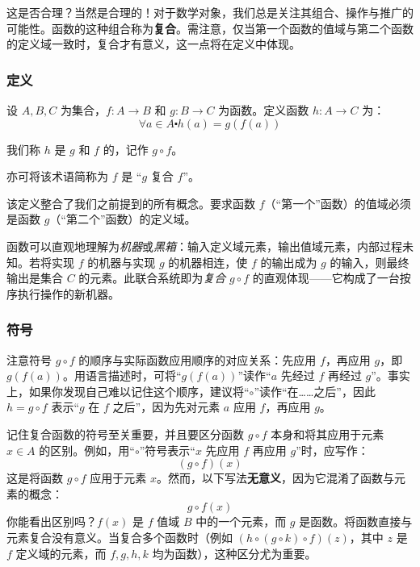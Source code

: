 这是否合理？当然是合理的！对于数学对象，我们总是关注其组合、操作与推广的可能性。函数的这种组合称为\textbf{复合}。需注意，仅当第一个函数的值域与第二个函数的定义域一致时，复合才有意义，这一点将在定义中体现。

\subsubsection*{定义}

\begin{definition}
    设 $A, B, C$ 为集合，$f : A \to B$ 和 $g : B \to C$ 为函数。定义函数 $h : A \to C$ 为：
    \[\forall a \in A \centerdot h(a) = g(f(a))\]
    
    我们称 $h$ 是 $g$ 和 $f$ 的，记作 $g \circ f$。

    亦可将该术语简称为 $f$ 是 ``$g$ 复合 $f$''。
\end{definition}

该定义整合了我们之前提到的所有概念。要求函数 $f$（``第一个''函数）的值域必须是函数 $g$（``第二个''函数）的定义域。

函数可以直观地理解为\emph{机器}或\emph{黑箱}：输入定义域元素，输出值域元素，内部过程未知。若将实现 $f$ 的机器与实现 $g$ 的机器相连，使 $f$ 的输出成为 $g$ 的输入，则最终输出是集合 $C$ 的元素。此联合系统即为\emph{复合} $g \circ f$ 的直观体现——它构成了一台按序执行操作的新机器。

\subsubsection*{符号}

注意符号 $g \circ f$ 的顺序与实际函数应用顺序的对应关系：先应用 $f$，再应用 $g$，即 $g(f(a))$。用语言描述时，可将``$g(f(a))$''读作``$a$ 先经过 $f$ 再经过 $g$''。事实上，如果你发现自己难以记住这个顺序，建议将``$\circ$''读作``在……之后''，因此 $h = g \circ f$ 表示``$g$ 在 $f$ 之后''，因为先对元素 $a$ 应用 $f$，再应用 $g$。

记住复合函数的符号至关重要，并且要区分函数 $g \circ f$ 本身和将其应用于元素 $x \in A$ 的区别。例如，用``$\circ$''符号表示``$x$ 先应用 $f$ 再应用 $g$''时，应写作：
\[(g \circ f)(x)\]
这是将函数 $g \circ f$ 应用于元素 $x$。然而，以下写法\textbf{无意义}，因为它混淆了函数与元素的概念：
\[g \circ f(x)\]
你能看出区别吗？$f(x)$ 是 $f$ 值域 $B$ 中的一个元素，而 $g$ 是函数。将函数直接与元素复合没有意义。当复合多个函数时（例如 $(h \circ (g \circ k) \circ f)(z)$，其中 $z$ 是 $f$ 定义域的元素，而 $f,g,h,k$ 均为函数），这种区分尤为重要。


